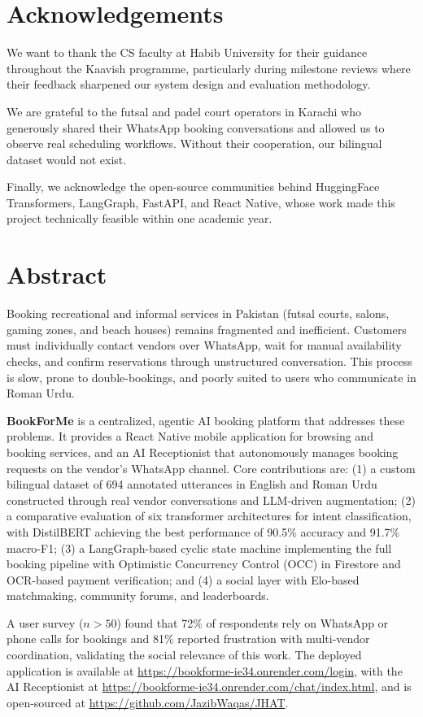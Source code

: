 \documentclass[12pt,a4paper,oneside]{report}
\begin{document}
\chapter*{Acknowledgements}

We want to thank the CS faculty at Habib University for their guidance throughout
the Kaavish programme, particularly during milestone reviews where their feedback
sharpened our system design and evaluation methodology.

We are grateful to the futsal and padel court operators in Karachi who generously
shared their WhatsApp booking conversations and allowed us to observe real scheduling
workflows.  Without their cooperation, our bilingual dataset would not exist.

Finally, we acknowledge the open-source communities
behind HuggingFace Transformers, LangGraph, FastAPI, and React Native, whose work
made this project technically feasible within one academic year.

\chapter*{Abstract}
Booking recreational and informal services in Pakistan (futsal courts, salons,
gaming zones, and beach houses) remains fragmented and inefficient. Customers must
individually contact vendors over WhatsApp, wait for manual availability checks, and
confirm reservations through unstructured conversation. This process is slow, prone
to double-bookings, and poorly suited to users who communicate in Roman Urdu.

\textbf{BookForMe} is a centralized, agentic AI booking platform that addresses
these problems.  It provides a React Native mobile application for browsing and
booking services, and an AI Receptionist that autonomously manages booking requests
on the vendor's WhatsApp channel.  Core contributions are: (1) a custom bilingual
dataset of 694 annotated utterances in English and Roman Urdu constructed through
real vendor conversations and LLM-driven augmentation; (2) a comparative evaluation
of six transformer architectures for intent classification, with DistilBERT achieving
the best performance of 90.5\% accuracy and 91.7\% macro-F1; (3) a LangGraph-based
cyclic state machine implementing the full booking pipeline with Optimistic
Concurrency Control (OCC) in Firestore and OCR-based payment verification; and (4) a
social layer with Elo-based matchmaking, community forums, and leaderboards.

A user survey ($n>50$) found that 72\% of respondents rely on WhatsApp or phone
calls for bookings and 81\% reported frustration with multi-vendor coordination,
validating the social relevance of this work.  The deployed application is available at
\url{https://bookforme-ie34.onrender.com/login}, with the AI Receptionist at
\url{https://bookforme-ie34.onrender.com/chat/index.html}, and is open-sourced at
\url{https://github.com/JazibWaqas/JHAT}.
\end{document}
